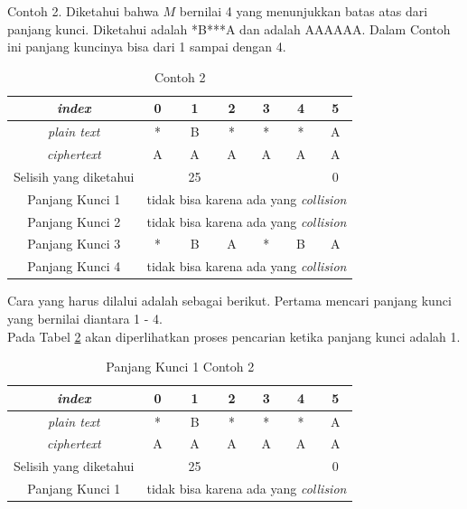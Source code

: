 	 Contoh 2. Diketahui bahwa $M$ bernilai 4 yang menunjukkan batas atas dari panjang kunci. Diketahui \plaintext adalah *B***A dan \ciphertext adalah AAAAAA. Dalam Contoh ini panjang kuncinya bisa dari 1 sampai dengan 4. 
	 \begin{table}[H]
	 	\centering
	 	\caption{Contoh 2}
	 	\begin{tabular}{|c|c|c|c|c|c|c|}\hline
		\textit{index}&0&1&2&3&4&5\\ \hline
	 	\textit{plain text}&*&B&*&*&*&A\\ \hline
	 	\textit{ciphertext}&A&A&A&A&A&A\\ \hline
	 	Selisih yang diketahui& &25& & & &0\\ \hline
	 	Panjang Kunci 1 & \multicolumn{6}{c|}{tidak bisa karena ada yang \textit{collision}}\\ \hline
	 	Panjang Kunci 2 & \multicolumn{6}{c|}{tidak bisa karena ada yang \textit{collision}}\\ \hline
	 	Panjang Kunci 3 &*&B&A&*&B&A \\ \hline
	 	Panjang Kunci 4 & \multicolumn{6}{c|}{tidak bisa karena ada yang \textit{collision}}\\ \hline
	 	\end{tabular}
	 	\label{tab:contoh2}
	\end{table}
	Cara yang harus dilalui adalah sebagai berikut. Pertama mencari panjang kunci yang bernilai diantara 1 - 4. \\
	Pada Tabel \ref{tab:k1contoh2} akan diperlihatkan proses pencarian ketika panjang kunci adalah 1.
	\begin{table}[H]
	 	\centering
	 	\caption{Panjang Kunci 1 Contoh 2}
	 	\setlength{\arrayrulewidth}{.08em}
	 	\begin{tabular}{|c|c|c|c|c|c|c|}\hline
		\textit{index}&0&1&2&3&4&5\\ \hline
	 	\textit{plain text}&\cellcolor{blue!15}*&\cellcolor{yellow!25}B&\cellcolor{green!15}*&\cellcolor{lime!25}*&\cellcolor{pink!30}*&\cellcolor{red!25}A\\ \hline
	 	\textit{ciphertext}&\cellcolor{blue!15}A&\cellcolor{yellow!25}A&\cellcolor{green!15}A&\cellcolor{lime!25}A&\cellcolor{pink!30}A&\cellcolor{red!25}A\\ \hline
	 	Selisih yang diketahui& &25& & & &0\\ \hline
	 	Panjang Kunci 1 & \multicolumn{6}{c|}{tidak bisa karena ada yang \textit{collision}}\\ \hline
	 	\end{tabular}
	 	\label{tab:k1contoh2}
	\end{table}	
	
